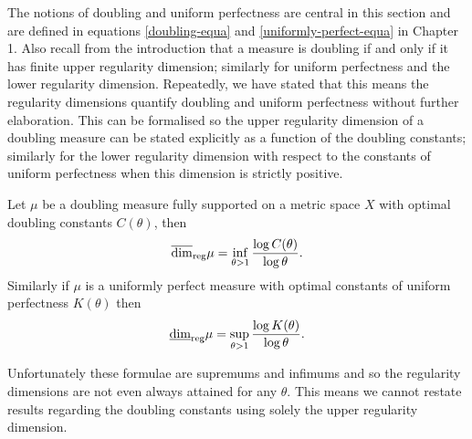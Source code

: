 The notions of doubling and uniform perfectness are central in this section and are defined in equations \eqref{doubling-equa} and \eqref{uniformly-perfect-equa} in Chapter 1. Also recall from the introduction that a measure is doubling if and only if it has finite upper regularity dimension; similarly for uniform perfectness and the lower regularity dimension. Repeatedly, we have stated that this means the regularity dimensions quantify doubling and uniform perfectness without further elaboration. This can be formalised so the upper regularity dimension of a doubling measure can be stated explicitly as a function of the doubling constants; similarly for the lower regularity dimension with respect to the constants of uniform perfectness when this dimension is strictly positive. 

\begin{theorem}\label{ch-quantifying:equivalence}
Let $\mu$ be a doubling measure fully supported on a metric space $X$ with optimal doubling constants $C(\theta)$, then $$\overline{\dim}_{\textup{reg}} \mu = \inf_{\theta > 1}\frac{\log C(\theta)}{\log \theta}.$$ Similarly if $\mu$ is a uniformly perfect measure with optimal constants of uniform perfectness $K(\theta)$ then $$\underline{\dim}_{\textup{reg}} \mu = \sup_{\theta > 1} \frac{\log K(\theta)}{\log \theta}.$$
\end{theorem}


Unfortunately these formulae are supremums and infimums and so the regularity dimensions are not even always attained for any $\theta$. This means we cannot restate results regarding the doubling constants using solely the upper regularity dimension.

